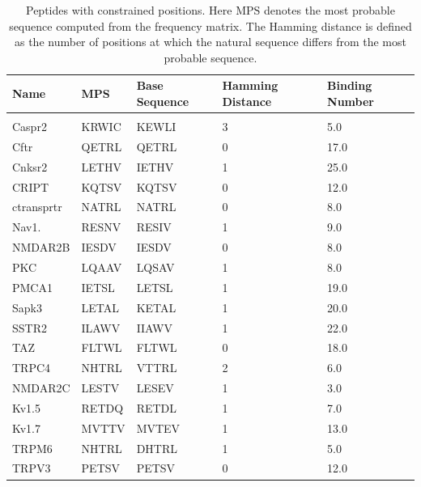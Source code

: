 \documentclass[a4paper, 12pt]{article}
\begin{document}
\begin{enumerate}
\begin{table}[!h]
\centering
\caption{Peptides with constrained positions. Here MPS denotes the most probable sequence computed from the frequency matrix. The Hamming distance is defined as the number of positions at which the natural sequence differs from the most probable sequence.}
\label{Zero_entopy peptides}
\begin{tabular}{lllll}
\hline
Name       & MPS   & Base Sequence & Hamming Distance & Binding Number \\ \hline
           &       &               &                  &                \\ \hline
Caspr2     & KRWIC & KEWLI         & 3                & 5.0            \\ \hline
Cftr       & QETRL & QETRL         & 0                & 17.0           \\ \hline
Cnksr2     & LETHV & IETHV         & 1                & 25.0           \\ \hline
CRIPT      & KQTSV & KQTSV         & 0                & 12.0           \\ \hline
ctransprtr & NATRL & NATRL         & 0                & 8.0            \\ \hline
Nav1.      & RESNV & RESIV         & 1                & 9.0            \\ \hline
NMDAR2B    & IESDV & IESDV         & 0                & 8.0            \\ \hline
PKC        & LQAAV & LQSAV         & 1                & 8.0            \\ \hline
PMCA1      & IETSL & LETSL         & 1                & 19.0           \\ \hline
Sapk3      & LETAL & KETAL         & 1                & 20.0           \\ \hline
SSTR2      & ILAWV & IIAWV         & 1                & 22.0           \\ \hline
TAZ        & FLTWL & FLTWL         & 0                & 18.0           \\ \hline
TRPC4      & NHTRL & VTTRL         & 2                & 6.0            \\ \hline
NMDAR2C    & LESTV & LESEV         & 1                & 3.0            \\ \hline
Kv1.5      & RETDQ & RETDL         & 1                & 7.0            \\ \hline
Kv1.7      & MVTTV & MVTEV         & 1                & 13.0           \\ \hline
TRPM6      & NHTRL & DHTRL         & 1                & 5.0            \\ \hline
TRPV3      & PETSV & PETSV         & 0                & 12.0           \\ \hline
\end{tabular}
\end{table}


\end{enumerate}
\end{document}
